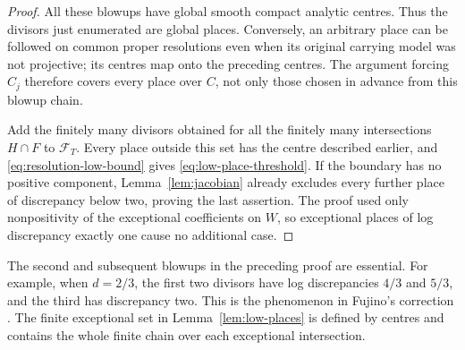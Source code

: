 \begin{proof}
All these blowups have global smooth compact analytic centres.  Thus the
divisors just enumerated are global places.  Conversely, an arbitrary
place can be followed on common proper resolutions even when its
original carrying model was not projective; its centres map onto the
preceding centres.  The argument forcing $C_j$ therefore covers every
place over $C$, not only those chosen in advance from this blowup chain.

Add the finitely many divisors obtained for all the finitely many
intersections $H\cap F$ to $\mathcal F_T$.  Every place outside this set
has the centre described earlier, and
\eqref{eq:resolution-low-bound} gives
\eqref{eq:low-place-threshold}.  If the boundary has no positive
component, Lemma~\ref{lem:jacobian} already excludes every further place
of discrepancy below two, proving the last assertion.
The proof used only nonpositivity of the exceptional coefficients on
$W$, so exceptional places of log discrepancy exactly one cause no
additional case.
\end{proof}

\begin{remark}
The second and subsequent blowups in the preceding proof are essential.
For example, when $d=2/3$, the first two divisors have log discrepancies
$4/3$ and $5/3$, and the third has discrepancy two.  This is the phenomenon
in Fujino's correction \cite[Example~2.1]{Fujino2005Addendum}.  The finite
exceptional set in Lemma~\ref{lem:low-places} is defined by centres and
contains the whole finite chain over each exceptional intersection.
\end{remark}
